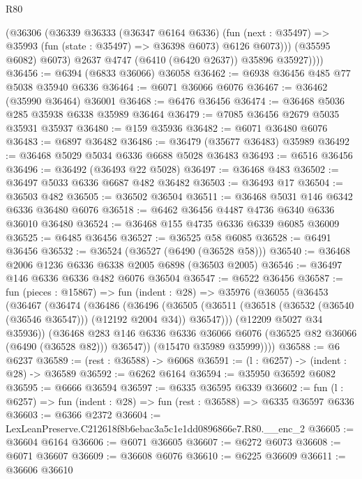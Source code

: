 \begin{lexlean}{R80}
\begin{coremodule}
              (@36306
                (@36339
                  @36333
                  (@36347 @6164 @6336)
                  (fun (next : @35497) =>
                  @35993 (fun (state : @35497) => @36398 @6073) @6126 @6073)))
              (@35595 @6082)
              @6073)
            @2637
            @4747
            (@6410 (@6420 @2637))
            @35896
            @35927))))
@36456 := @6394 (@6833 @36066) @36058
@36462 := @6938 @36456 @485 @77 @5038 @35940 @6336
@36464 := @6071 @36066 @6076
@36467 := @36462 (@35990 @36464) @36001
@36468 := @6476 @36456
@36474 := @36468 @5036 @285 @35938 @6338 @35989 @36464
@36479 := @7085 @36456 @2679 @5035 @35931 @35937
@36480 := @159 @35936
@36482 := @6071 @36480 @6076
@36483 := @6897 @36482
@36486 := @36479 (@35677 @36483) @35989
@36492 := @36468 @5029 @5034 @6336 @6688 @5028 @36483
@36493 := @6516 @36456
@36496 := @36492 (@36493 @22 @5028)
@36497 := @36468 @483
@36502 := @36497 @5033 @6336 @6687 @482 @36482
@36503 := @36493 @17
@36504 := @36503 @482
@36505 := @36502 @36504
@36511 := @36468 @5031 @146 @6342 @6336 @36480 @6076
@36518 := @6462 @36456 @4487 @4736 @6340 @6336 @36010 @36480
@36524 := @36468 @155 @4735 @6336 @6339 @6085 @36009
@36525 := @6485 @36456
@36527 := @36525 @58 @6085
@36528 := @6491 @36456
@36532 := @36524 (@36527 (@6490 (@36528 @58)))
@36540 := @36468 @2006 @1236 @6336 @6338 @2005 @6898 (@36503 @2005)
@36546 := @36497 @146 @6336 @6336 @482 @6076 @36504
@36547 := @6522 @36456
@36587 := fun (pieces : @15867) =>
  fun (indent : @28) =>
  @35976
    (@36055
      (@36453
        (@36467
          (@36474
            (@36486
              (@36496
                (@36505
                  (@36511 (@36518 (@36532 (@36540 (@36546 @36547))) (@12192 @2004 @34)) @36547)))
              (@12209 @5027 @34 @35936))
            (@36468
              @283
              @146
              @6336
              @6336
              @36066
              @6076
              (@36525 @82 @36066 (@6490 (@36528 @82)))
              @36547))
          (@15470 @35989 @35999))))
@36588 := @6 @6237
@36589 := (rest : @36588) -> @6068
@36591 := (l : @6257) -> (indent : @28) -> @36589
@36592 := @6262 @6164
@36594 := @35950 @36592 @6082
@36595 := @6666 @36594
@36597 := @6335 @36595 @6339
@36602 := fun (l : @6257) => fun (indent : @28) => fun (rest : @36588) => @6335 @36597 @6336
@36603 := @6366 @2372
@36604 := LexLeanPreserve.C212618f8b6ebac3a5c1e1dd0896866e7.R80.__enc_2
@36605 := @36604 @6164
@36606 := @6071 @36605
@36607 := @6272 @6073
@36608 := @6071 @36607
@36609 := @36608 @6076
@36610 := @6225 @36609
@36611 := @36606 @36610

\end{coremodule}
\end{lexlean}
